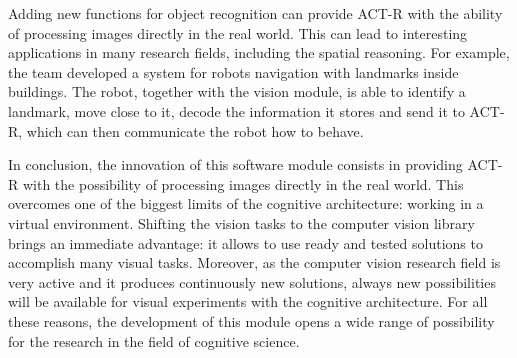 	Adding new functions for object recognition can provide \mbox{ACT-R} with the ability of processing images directly in the real world. 
	This can lead to interesting applications in many research fields, including the spatial reasoning. 
	For example, the team developed a system for robots navigation with landmarks inside buildings. 
	The robot, together with the vision module, is able to identify a landmark, move close to it, decode the information it stores and send it to \mbox{ACT-R}, which can then communicate the robot how to behave.


	In conclusion, the innovation of this software module consists in providing \mbox{ACT-R} with the possibility of processing images directly in the real world.
	This overcomes one of the biggest limits of the cognitive architecture: working in a virtual environment.
	Shifting the vision tasks to the computer vision library brings an immediate advantage: it allows to use ready and tested solutions to accomplish many visual tasks.
	Moreover, as the computer vision research field is very active and it produces continuously new solutions, always new possibilities will be available for visual experiments with the cognitive architecture.
	For all these reasons, the development of this module opens a wide range of possibility for the research in the field of cognitive science.




